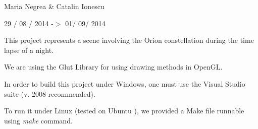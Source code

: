 Maria Negrea \& Catalin Ionescu

29 / 08 / 2014 -\/$>$ 01/ 09/ 2014

This project represents a scene involving the Orion constellation during the time lapse of a night.

We are using the Glut Library for using drawing methods in Open\-G\-L.

In order to build this project under Windows, one must use the Visual Studio suite (v. 2008 recommended).

To run it under Linux (tested on Ubuntu ), we provided a Make file runnable using {\itshape make} command. 